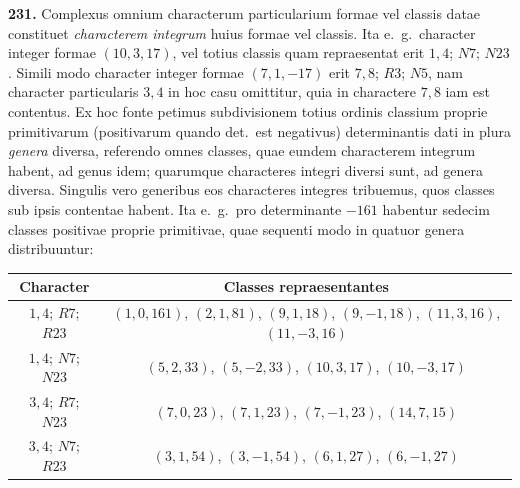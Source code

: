\documentclass[12pt,a4paper]{article}
\theoremstyle{plain}
\theoremstyle{definition}
\theoremstyle{remark}
\begin{document}
\textbf{231.}
Complexus omnium characterum particularium formae vel classis datae constituet \emph{characterem integrum} huius formae vel classis. Ita e.\ g.\ character integer formae $(10,3,17)$, vel totius classis quam repraesentat erit $1,4$; $N7$; $N23$. Simili modo character integer formae $(7,1,-17)$ erit $7,8$; $R3$; $N5$, nam character particularis $3,4$ in hoc casu omittitur, quia in charactere $7,8$ iam est contentus. Ex hoc fonte petimus subdivisionem totius ordinis classium proprie primitivarum (positivarum quando det.\ est negativus) determinantis dati in plura \emph{genera} diversa, referendo omnes classes, quae eundem characterem integrum habent, ad genus idem; quarumque characteres integri diversi sunt, ad genera diversa. Singulis vero generibus eos characteres integres tribuemus, quos classes sub ipsis contentae habent. Ita e.\ g.\ pro determinante $-161$ habentur sedecim classes positivae proprie primitivae, quae sequenti modo in quatuor genera distribuuntur:

\begin{center}
\begin{tabular}{c|c}
Character & Classes repraesentantes \\
\hline
$1,4$; $R7$; $R23$ & $(1,0,161)$, $(2,1,81)$, $(9,1,18)$, $(9,-1,18)$, $(11,3,16)$, $(11,-3,16)$ \\
$1,4$; $N7$; $N23$ & $(5,2,33)$, $(5,-2,33)$, $(10,3,17)$, $(10,-3,17)$ \\
$3,4$; $R7$; $N23$ & $(7,0,23)$, $(7,1,23)$, $(7,-1,23)$, $(14,7,15)$ \\
$3,4$; $N7$; $R23$ & $(3,1,54)$, $(3,-1,54)$, $(6,1,27)$, $(6,-1,27)$
\end{tabular}
\end{center}
\end{document}
